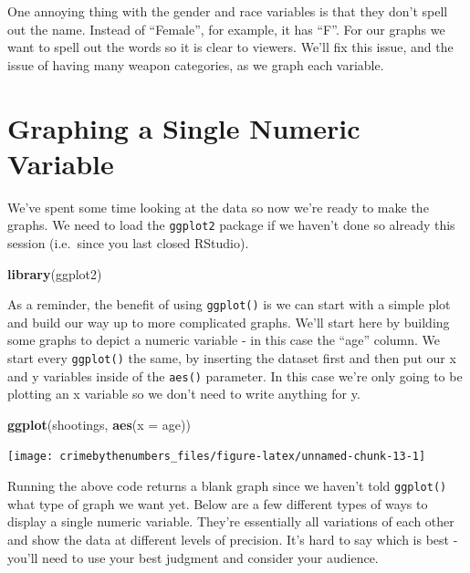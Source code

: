 \documentclass[
  12pt,
]{book}
\newenvironment{Shaded}{\begin{snugshade}}{\end{snugshade}}
\newcommand{\DataTypeTok}[1]{\textcolor[rgb]{0.27,0.27,0.27}{#1}}
\newcommand{\KeywordTok}[1]{\textcolor[rgb]{0.27,0.27,0.27}{\textbf{#1}}}
\newcommand{\NormalTok}[1]{#1}
\begin{document}
One annoying thing with the gender and race variables is that they don't spell out the name. Instead of ``Female'', for example, it has ``F''. For our graphs we want to spell out the words so it is clear to viewers. We'll fix this issue, and the issue of having many weapon categories, as we graph each variable.

\hypertarget{graphing-a-single-numeric-variable}{%
\section{Graphing a Single Numeric Variable}\label{graphing-a-single-numeric-variable}}

We've spent some time looking at the data so now we're ready to make the graphs. We need to load the \texttt{ggplot2} package if we haven't done so already this session (i.e.~since you last closed RStudio).

\begin{Shaded}
\begin{Highlighting}[]
\KeywordTok{library}\NormalTok{(ggplot2)}
\end{Highlighting}
\end{Shaded}

As a reminder, the benefit of using \texttt{ggplot()} is we can start with a simple plot and build our way up to more complicated graphs. We'll start here by building some graphs to depict a numeric variable - in this case the ``age'' column. We start every \texttt{ggplot()} the same, by inserting the dataset first and then put our x and y variables inside of the \texttt{aes()} parameter. In this case we're only going to be plotting an x variable so we don't need to write anything for y.

\begin{Shaded}
\begin{Highlighting}[]
\KeywordTok{ggplot}\NormalTok{(shootings, }\KeywordTok{aes}\NormalTok{(}\DataTypeTok{x =}\NormalTok{ age))}
\end{Highlighting}
\end{Shaded}

\begin{center}\texttt{[image: crimebythenumbers\_files/figure-latex/unnamed-chunk-13-1]} \end{center}

Running the above code returns a blank graph since we haven't told \texttt{ggplot()} what type of graph we want yet. Below are a few different types of ways to display a single numeric variable. They're essentially all variations of each other and show the data at different levels of precision. It's hard to say which is best - you'll need to use your best judgment and consider your audience.
\end{document}
